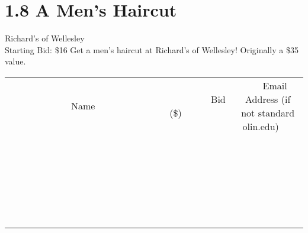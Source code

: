 \documentclass[11pt]{article}
\begin{document}
\section*{1.8 A Men's Haircut}
Richard's of Wellesley
\\
Starting Bid: \$16
\newline
Get a men's haircut at Richard's of Wellesley! Originally a \$35 value.
\\[6ex]
\begin{tabular}{c c c}
~~~~~~~~~~~~~Name~~~~~~~~~~~~~ & ~~~~~~~~~Bid (\$)~~~~~~~~~  & ~~~Email Address (if not standard olin.edu)~~~\\
 & & \\
\hline
 & & \\
\hline
 & & \\
\hline
 & & \\
\hline
 & & \\
\hline
 & & \\
\hline
 & & \\
\hline
 & & \\
\hline
 & & \\
\hline
 & & \\
\hline
 & & \\
\hline
 & & \\
\hline
 & & \\
\hline
 & & \\
\hline
 & & \\
\hline
 & & \\
\hline
 & & \\
\hline
 & & \\
\hline
 & & \\
\hline
 & & \\
\hline
 & & \\
\hline
 & & \\
\hline
 & & \\
\hline
 & & \\
\hline
 & & \\
\hline
 & & \\
\hline
\end{tabular}
\newpage
\end{document}
